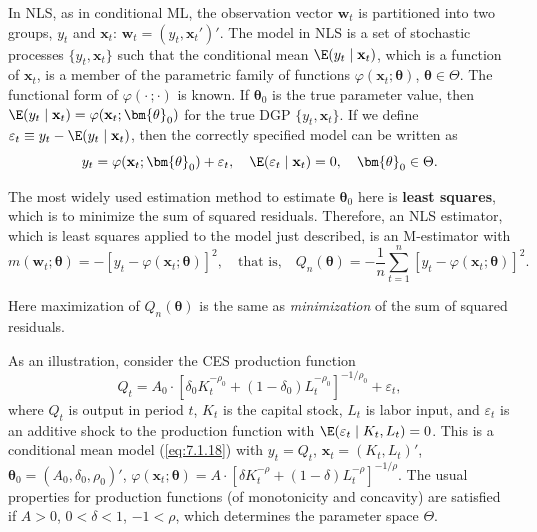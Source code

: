 In NLS, as in conditional ML, the observation vector $\mathbf{w}_t$ is partitioned into two groups, $y_t$ and $\mathbf{x}_t$: $\mathbf{w}_t = (y_t, \mathbf{x}_t')'$. The model in NLS is a set of stochastic processes $\{y_t, \mathbf{x}_t\}$ such that the conditional mean $\E(y_t \mid \mathbf{x}_t)$, which is a function of $\mathbf{x}_t$, is a member of the parametric family of functions $\varphi(\mathbf{x}_t; \bm{\theta})$, $\bm{\theta} \in \Theta$. The functional form of $\varphi(\cdot\,; \cdot)$ is known. If $\bm{\theta}_0$ is the true parameter value, then $\E(y_t \mid \mathbf{x}_t) = \varphi(\mathbf{x}_t; \bm{\theta}_0)$ for the true DGP $\{y_t, \mathbf{x}_t\}$. If we define $\varepsilon_t \equiv y_t - \E(y_t \mid \mathbf{x}_t)$, then the correctly specified model can be written as
\begin{equation}
\label{eq:7.1.18}
y_t = \varphi(\mathbf{x}_t; \bm{\theta}_0) + \varepsilon_t, \quad \E(\varepsilon_t \mid \mathbf{x}_t) = 0, \quad \bm{\theta}_0 \in \Theta.
\end{equation}

The most widely used estimation method to estimate $\bm{\theta}_0$ here is \textbf{least squares}, which is to minimize the sum of squared residuals. Therefore, an NLS estimator, which is least squares applied to the model just described, is an M-estimator with
\begin{equation}
\label{eq:7.1.19}
m(\mathbf{w}_t; \bm{\theta}) = -[y_t - \varphi(\mathbf{x}_t; \bm{\theta})]^2, \quad \text{that is,} \quad Q_n(\bm{\theta}) = -\frac{1}{n} \sum_{t=1}^{n} [y_t - \varphi(\mathbf{x}_t; \bm{\theta})]^2.
\end{equation}

Here maximization of $Q_n(\bm{\theta})$ is the same as \emph{minimization} of the sum of squared residuals.

\begin{example}
\label{ex:7.4}
As an illustration, consider the CES production function
\begin{equation}
\label{eq:7.1.20}
Q_t = A_0 \cdot \left[ \delta_0 K_t^{-\rho_0} + (1 - \delta_0) L_t^{-\rho_0} \right]^{-1/\rho_0} + \varepsilon_t,
\end{equation}
where $Q_t$ is output in period $t$, $K_t$ is the capital stock, $L_t$ is labor input, and $\varepsilon_t$ is an additive shock to the production function with $\E(\varepsilon_t \mid K_t, L_t) = 0$. This is a conditional mean model (\ref{eq:7.1.18}) with $y_t = Q_t$, $\mathbf{x}_t = (K_t, L_t)'$, $\bm{\theta}_0 = (A_0, \delta_0, \rho_0)'$, $\varphi(\mathbf{x}_t; \bm{\theta}) = A \cdot [\delta K_t^{-\rho} + (1 - \delta) L_t^{-\rho}]^{-1/\rho}$. The usual properties for production functions (of monotonicity and concavity) are satisfied if $A > 0$, $0 < \delta < 1$, $-1 < \rho$, which determines the parameter space $\Theta$.
\end{example}

